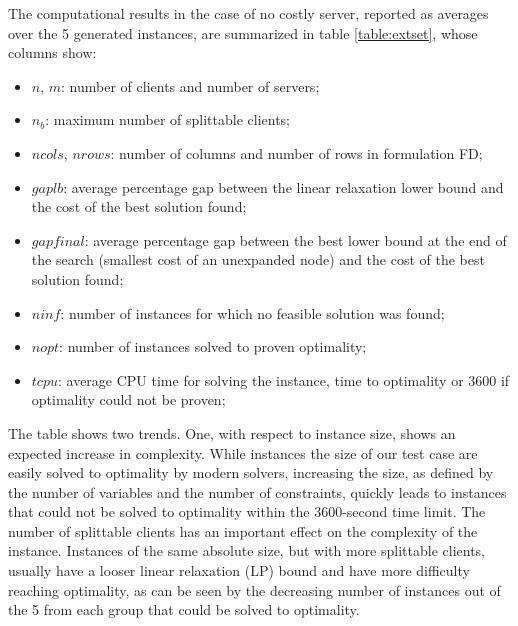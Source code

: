 \documentclass[preprint,11pt,authoryear]{elsarticle}
\begin{document}
The computational results in the case of no costly server, reported as averages over the 5 generated instances, are summarized in table \ref{table:extset}, whose columns show:
\begin{itemize}
	\item $n$, $m$: number of clients and number of servers;
	\item $n_b$: maximum number of splittable clients;
	\item $ncols$, $nrows$: number of columns and number of rows in formulation FD;
	\item $gaplb$: average percentage gap between the linear relaxation lower bound and the cost of the best solution found;
	\item $gapfinal$: average percentage gap between the best lower bound at the end of the search (smallest cost of an unexpanded node) and the cost of the best solution found;
	\item $ninf$: number of instances for which no feasible solution was found;
	\item $nopt$: number of instances solved to proven optimality;
	\item $tcpu$: average CPU time for solving the instance, time to optimality or 3600 if optimality could not be proven;
\end{itemize}

The table shows two trends. One, with respect to instance size, shows an expected increase in complexity. While instances the size of our test case are easily solved to optimality by modern solvers, increasing the size, as defined by the number of variables and the number of constraints, quickly leads to instances that could not be solved to optimality within the 3600-second time limit. 
The number of splittable clients has an important effect on the complexity of the instance. Instances of the same absolute size, but with more splittable clients, usually have a looser linear relaxation (LP) bound and have more difficulty reaching optimality, as can be seen by the decreasing number of instances out of the 5 from each group that could be solved to optimality.
\end{document}
